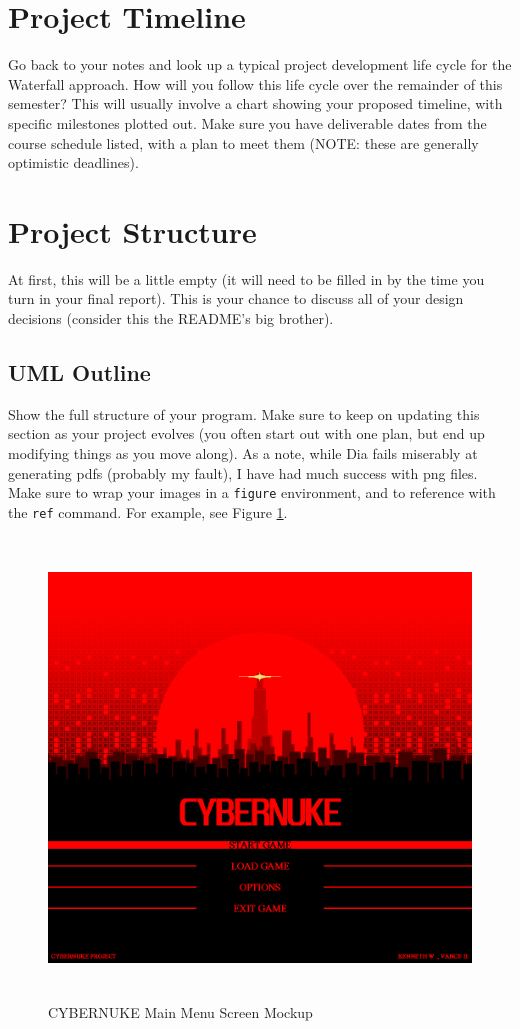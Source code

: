 \documentclass[10pt,conference,onecolumn,compsoc]{IEEEtran}
\begin{document}
\section{Project Timeline}
Go back to your notes and look up a typical project development life cycle for the Waterfall approach.  How will you follow this life cycle over the remainder of this semester?  This will usually involve a chart showing your proposed timeline, with specific milestones plotted out.  Make sure you have deliverable dates from the course schedule listed, with a plan to meet them (NOTE: these are generally optimistic deadlines).



\section{Project Structure}
At first, this will be a little empty (it will need to be filled in by the time you turn in your final report).  This is your chance to discuss all of your design decisions (consider this the README's big brother).

\subsection{UML Outline}
Show the full structure of your program.  Make sure to keep on updating this section as your project evolves (you often start out with one plan, but end up modifying things as you move along).  As a note, while Dia fails miserably at generating pdfs (probably my fault), I have had much success with png files.  Make sure to wrap your images in a \texttt{figure} environment, and to reference with the \texttt{ref} command.  For example, see Figure \ref{main_menu_mockup}.

\begin{figure}[ht!]
\centering
\includegraphics[height=462px, width=500px]{Mockups/CYBERNUKE_MAIN_MENU_2.png}
\caption{CYBERNUKE Main Menu Screen Mockup}
\label{main_menu_mockup}
\end{figure}
\end{document}
